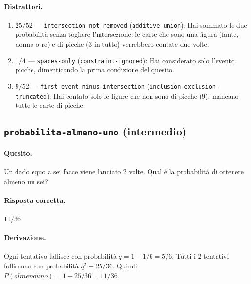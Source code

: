 \paragraph{Distrattori.}
\begin{enumerate}
  \item $25/52$ --- \texttt{intersection-not-removed} (\texttt{additive-union}): Hai sommato le due probabilità senza togliere l'intersezione: le carte che sono una figura (fante, donna o re) e di picche (3 in tutto) verrebbero contate due volte.
  \item $1/4$ --- \texttt{spades-only} (\texttt{constraint-ignored}): Hai considerato solo l'evento \guillemotleft{}picche\guillemotright{}, dimenticando la prima condizione del quesito.
  \item $9/52$ --- \texttt{first-event-minus-intersection} (\texttt{inclusion-exclusion-truncated}): Hai contato solo le figure che non sono di picche (9): mancano tutte le carte di picche.
\end{enumerate}

\subsection{\texorpdfstring{\texttt{probabilita-almeno-uno} (intermedio)}{probabilita-almeno-uno (intermedio)}}

\paragraph{Quesito.} Un dado equo a sei facce viene lanciato 2 volte. Qual è la probabilità di ottenere almeno un sei?

\paragraph{Risposta corretta.} $11/36$

\paragraph{Derivazione.} Ogni tentativo fallisce con probabilità $q = 1 - 1/6 = 5/6$. Tutti i 2 tentativi falliscono con probabilità $q^{2} = 25/36$. Quindi $P(almeno uno) = 1 - 25/36 = 11/36$.

